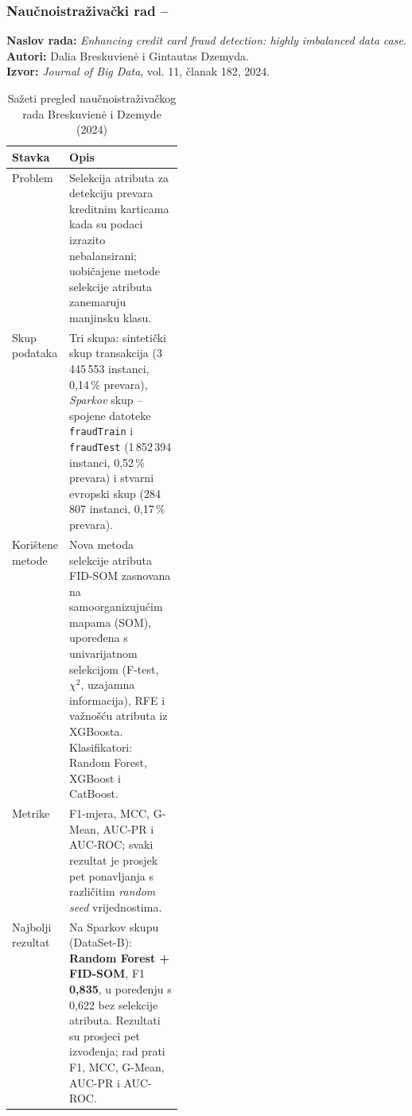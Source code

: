 \subsubsection*{Naučnoistraživački rad -- \ClanTri}

\textbf{Naslov rada:}
\emph{Enhancing credit card fraud detection: highly imbalanced data case}.\\

\textbf{Autori:}
Dalia Breskuvienė i Gintautas Dzemyda.\\

\textbf{Izvor:}
\emph{Journal of Big Data}, vol. 11, članak 182,
2024. \cite{breskuviene2024fraud}

\begin{table}[H]
\centering
\caption{Sažeti pregled naučnoistraživačkog rada Breskuvienė i Dzemyde (2024)}
\label{tab:breskuviene-pregled}
\small
\renewcommand{\arraystretch}{1.22}
\begin{tabularx}{\linewidth}{@{}p{0.25\linewidth}Y@{}}
\toprule
\textbf{Stavka} & \textbf{Opis} \\
\midrule

Problem &
Selekcija atributa za detekciju prevara kreditnim karticama kada su
podaci izrazito nebalansirani; uobičajene metode selekcije atributa
zanemaruju manjinsku klasu. \\

Skup podataka &
Tri skupa: sintetički skup transakcija (3\,445\,553 instanci,
0,14\,\% prevara), \emph{Sparkov} skup -- spojene datoteke
\texttt{fraudTrain} i \texttt{fraudTest} (1\,852\,394 instanci,
0,52\,\% prevara) i stvarni evropski skup (284\,807 instanci,
0,17\,\% prevara). \\

Korištene metode &
Nova metoda selekcije atributa FID-SOM zasnovana na samoorganizujućim
mapama (SOM), upoređena s univarijatnom selekcijom (F-test, $\chi^2$,
uzajamna informacija), RFE i važnošću atributa iz XGBoosta.
Klasifikatori: Random Forest, XGBoost i CatBoost. \\

Metrike &
F1-mjera, MCC, G-Mean, AUC-PR i AUC-ROC; svaki rezultat je prosjek
pet ponavljanja s različitim \emph{random seed} vrijednostima. \\

Najbolji rezultat &
Na Sparkov skupu (DataSet-B): \textbf{Random Forest + FID-SOM},
F1 \textbf{0,835}, u poređenju s 0,622 bez selekcije atributa.
Rezultati su prosjeci pet izvođenja; rad prati F1, MCC, G-Mean, AUC-PR
i AUC-ROC. \\

\bottomrule
\end{tabularx}
\end{table}
